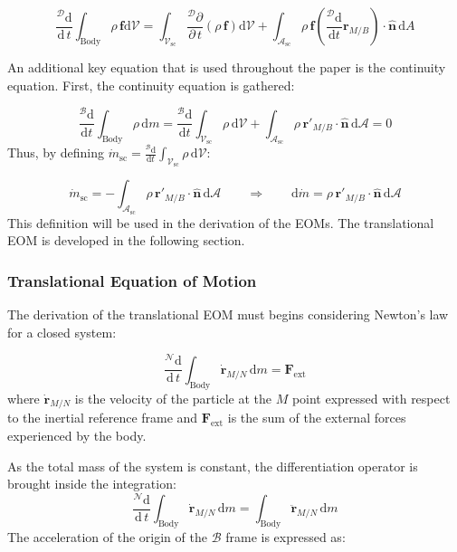 \begin{equation}
	\frac{^\mathcal{D}\text{d}}{\text{d}\,t}\int_{\text{Body}} \rho\,\bm{f}\text{d}\mathcal{V} = \int_{\mathcal{V}_\text{sc}} \frac{ ^\mathcal{D}\partial}{\partial\,t}\left(\rho\,\bm{f}\right)\text{d}\mathcal{V}+ \int_{\mathcal{A}_\text{sc}} \rho\,\bm{f} \left(\frac{^\mathcal{D}\text{d}}{\text{d}t}\bm{r}_{M/B}\right)\cdot \hat{\bm{n}}\,\text{d}A
\end{equation}

An additional key equation that is used throughout the paper is the continuity equation. First, the continuity equation is gathered:

\begin{equation}
	\frac{^\mathcal{B}\text{d}}{\text{d}t}\int_{\text{Body}} \rho\, \text{d}m = \frac{^\mathcal{B}\text{d}}{\text{d}t}\int_{\mathcal{V}_\text{sc}} \rho\, \text{d}\mathcal{V} + \int_{\mathcal{A}_\text{sc}} \rho\,\bm{r}'_{M/B} \cdot \hat{\bm{n}}\,\text{d}\mathcal{A}=0
\end{equation}
\noindent
Thus, by defining $\dot{m}_\text{sc} = \frac{^\mathcal{B}\text{d}}{\text{d}t}\int_{\mathcal{V}_\text{sc}} \rho\, \text{d}\mathcal{V}$:

\begin{equation}\label{eq:cambVar}
	\dot{m}_\text{sc} = - \int_{\mathcal{A}_\text{sc}} \rho\,\bm{r}'_{M/B} \cdot \hat{\bm{n}}\,\text{d}\mathcal{A} \qquad \Rightarrow \qquad \text{d}\dot{m} = \rho\,\bm{r}'_{M/B} \cdot \hat{\bm{n}}\,\text{d}\mathcal{A}
\end{equation}
This definition will be used in the derivation of the EOMs. The translational EOM is developed in the following section.

\subsubsection{Translational Equation of Motion}
The derivation of the translational EOM must begins considering Newton's law for a closed system:

\begin{equation}\label{eq:eq3}
	\frac{^{\mathcal{N}}\text{d}}{\text{d}\,t}\int_{\text{Body}}\dot{\bm{r}}_{M/N}\,	\text{d}m= \bm{F}_{\text{ext}}
\end{equation}
where $\dot{\bm{r}}_{M/N}$ is the velocity of the particle at the $M$ point expressed with respect to the inertial reference frame and $\bm{F}_{\text{ext}}$ is the sum of the external forces experienced by the body.

As the total mass of the system is constant, the differentiation operator is brought inside the integration:
\begin{equation}\label{eq:eq4}
	\frac{^{\mathcal{N}}\text{d}}{\text{d}\,t}\int_{\text{Body}}\dot{\bm{r}}_{M/N}\,	\text{d}m= \int_{\text{Body}}\ddot{\bm{r}}_{M/N}\,\text{d}m
\end{equation}
The acceleration of the origin of the $\mathcal{B}$ frame is expressed as:

